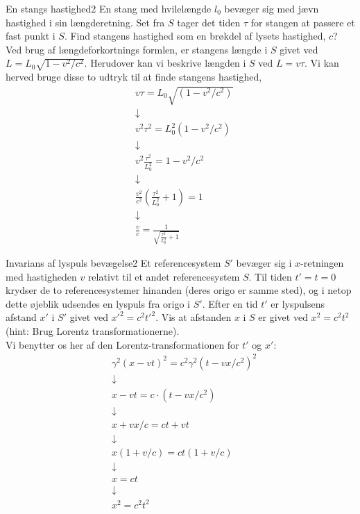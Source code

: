 \documentclass[crop=false, class=memoir]{standalone}
\begin{document}
\begin{opgave}{En stangs hastighed}{2}
	En stang med hvilelængde $l_0$ bevæger sig med jævn hastighed i sin længderetning. Set fra $S$ tager det tiden $\tau$ for stangen at passere et fast punkt i $S$. 
	\opg Find stangens hastighed som en brøkdel af lysets hastighed, $c$?\\
	
	Ved brug af længdeforkortnings formlen, er stangens længde i $S$ givet ved $L=L_0\sqrt{1-v^2/c^2}$. Herudover kan vi beskrive længden i $S$ ved $L=v\tau$. Vi kan herved bruge disse to udtryk til at finde stangens hastighed,
	\begin{align*}
		&v\tau=L_0\sqrt{(1-v^2/c^2)} \\
		&\downarrow \\
		&v^2\tau^2=L_0^2(1-v^2/c^2) \\
		&\downarrow \\
		&v^2\frac{\tau^2}{L_0^2}=1-v^2/c^2 \\
		&\downarrow \\
		&\frac{v^2}{c^2}(\frac{\tau^2}{L_0^2}+1)=1 \\
		&\downarrow \\
		&\frac{v}{c}=\frac{1}{\sqrt{\frac{\tau^2}{L_0^2}+1}}
	\end{align*}
\end{opgave}

\begin{opgave}{Invarians af lyspuls bevægelse}{2}
	Et referencesystem $S'$ bevæger sig i $x$-retningen med hastigheden $v$ relativt til et andet referencesystem $S$. Til tiden $t'=t=0$ krydser de to referencesystemer hinanden (deres origo er samme sted), og i netop dette øjeblik udsendes en lyspuls fra origo i $S'$. Efter en tid $t'$ er lyspulsens afstand $x'$ i $S'$ givet ved $x'^2 = c^2 t'^2$. 
	\opg Vis at afstanden $x$ i $S$ er givet ved $x^2 = c^2 t^2$ (hint: Brug Lorentz transformationerne).\\
	
		Vi benytter os her af den Lorentz-transformationen for $t'$ og $x'$:
	\begin{align*}
	&\gamma^2(x-vt)^2=c^2\gamma^2(t-vx/c^2)^2 \\
	&\downarrow \\
	&x-vt=c \cdot (t-vx/c^2) \\
	&\downarrow \\
	&x+vx/c=ct+vt \\
	&\downarrow \\
	&x(1+v/c)=ct(1+v/c) \\
	&\downarrow \\
	&x=ct \\
	&\downarrow \\
	&x^2=c^2t^2		
	\end{align*} 
\end{opgave}
\end{document}
